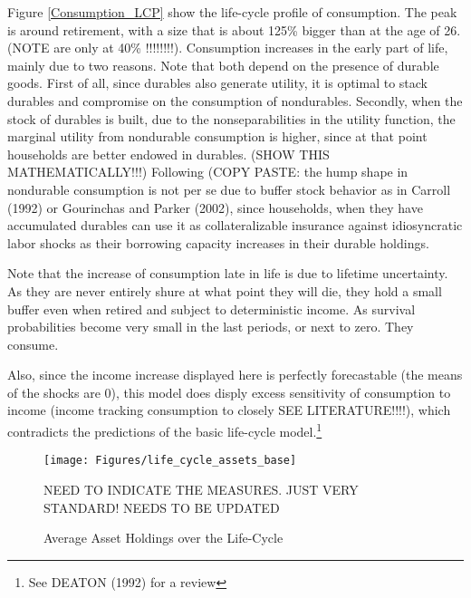 \documentclass[a4paper,12pt]{article}
\begin{document}
Figure \ref{Consumption_LCP} show the life-cycle profile of consumption. The peak is around retirement, with a size that is about 125\% bigger than at the age of 26. (NOTE \cite{FV&K2011} are only at 40\% !!!!!!!!). Consumption increases in the early part of life, mainly due to two reasons. Note that both depend on the presence of durable goods. First of all, since durables also generate utility, it is optimal to stack durables and compromise on the consumption of nondurables. Secondly, when the stock of durables is built, due to the nonseparabilities in the utility function, the marginal utility from nondurable consumption is higher, since at that point households are better endowed in durables. (SHOW THIS MATHEMATICALLY!!!)
Following \cite{FV&K2011} (COPY PASTE: the hump shape in nondurable consumption is not per se due to buffer stock behavior as in Carroll (1992) or Gourinchas and Parker (2002), since households, when they have accumulated durables can use it as collateralizable insurance against idiosyncratic labor shocks as their borrowing capacity increases in their durable holdings.

Note that the increase of consumption late in life is due to lifetime uncertainty. As they are never entirely shure at what point they will die, they hold a small buffer even when retired and subject to deterministic income. As survival probabilities become very small in the last periods, or next to zero. They consume. 

Also, since the income increase displayed here is perfectly forecastable (the means of the shocks are 0), this model does disply excess sensitivity of consumption to income (income tracking consumption to closely SEE LITERATURE!!!!), which contradicts the predictions of the 
basic life-cycle model.\footnote{See DEATON (1992) for a review}


\begin{figure}[!htbp]
\caption{Average Asset Holdings over the Life-Cycle} 
\label{asset_holdings_life_cycle}	%
\centering
\texttt{[image: Figures/life\_cycle\_assets\_base]}  %

\begin{minipage}{0.8\linewidth}
\footnotesize{NEED TO INDICATE THE MEASURES. JUST VERY STANDARD! NEEDS TO BE UPDATED}
\end{minipage}

\end{figure}
\end{document}
